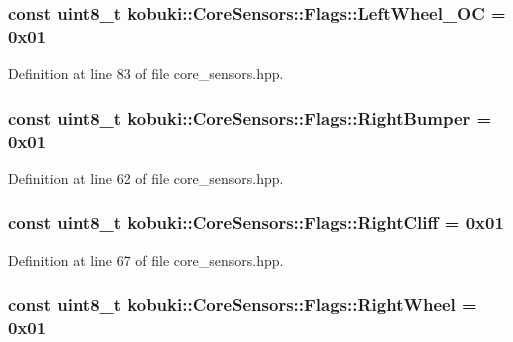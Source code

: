 \subsubsection[{\-Left\-Wheel\-\_\-\-O\-C}]{\setlength{\rightskip}{0pt plus 5cm}const uint8\-\_\-t {\bf kobuki\-::\-Core\-Sensors\-::\-Flags\-::\-Left\-Wheel\-\_\-\-O\-C} = 0x01\hspace{0.3cm}{\ttfamily  [static]}}\label{structkobuki_1_1CoreSensors_1_1Flags_a18f5b7c46447fa7a5661290ef052a863}


\-Definition at line 83 of file core\-\_\-sensors.\-hpp.

\subsubsection[{\-Right\-Bumper}]{\setlength{\rightskip}{0pt plus 5cm}const uint8\-\_\-t {\bf kobuki\-::\-Core\-Sensors\-::\-Flags\-::\-Right\-Bumper} = 0x01\hspace{0.3cm}{\ttfamily  [static]}}\label{structkobuki_1_1CoreSensors_1_1Flags_a46a0af0ca751224ee77ca8229dee8d74}


\-Definition at line 62 of file core\-\_\-sensors.\-hpp.

\subsubsection[{\-Right\-Cliff}]{\setlength{\rightskip}{0pt plus 5cm}const uint8\-\_\-t {\bf kobuki\-::\-Core\-Sensors\-::\-Flags\-::\-Right\-Cliff} = 0x01\hspace{0.3cm}{\ttfamily  [static]}}\label{structkobuki_1_1CoreSensors_1_1Flags_a26c8b51ff04d0aa820b11362cde089a9}


\-Definition at line 67 of file core\-\_\-sensors.\-hpp.

\subsubsection[{\-Right\-Wheel}]{\setlength{\rightskip}{0pt plus 5cm}const uint8\-\_\-t {\bf kobuki\-::\-Core\-Sensors\-::\-Flags\-::\-Right\-Wheel} = 0x01\hspace{0.3cm}{\ttfamily  [static]}}\label{structkobuki_1_1CoreSensors_1_1Flags_adcbe63546742933ef4f2e60ba2ba206b}


